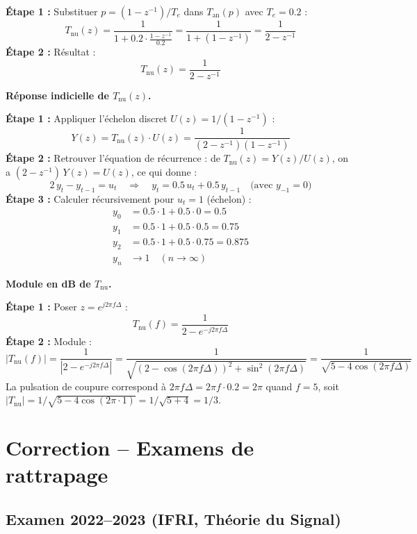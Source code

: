 \documentclass[12pt,a4paper]{article}
\newcommand{\step}[1]{\textcolor{coursbleu}{\textbf{Étape #1 :}}}
\newcommand{\encadre}[1]{\boxed{#1}}
\begin{document}
\begin{tcolorbox}[corrbox, title=Correction Q2]
\step{1} Substituer $p = (1-z^{-1})/T_e$ dans $T_{\text{an}}(p)$ avec $T_e = 0.2$ :
\[
  T_{\text{nu}}(z) = \frac{1}{1 + 0.2 \cdot \frac{1-z^{-1}}{0.2}}
                   = \frac{1}{1 + (1 - z^{-1})}
                   = \frac{1}{2 - z^{-1}}
\]
\step{2} Résultat :
\[
  \encadre{T_{\text{nu}}(z) = \frac{1}{2 - z^{-1}}}
\]

\textbf{Réponse indicielle de $T_{\text{nu}}(z)$.}

\step{1} Appliquer l'échelon discret $U(z) = 1/(1-z^{-1})$ :
\[
  Y(z) = T_{\text{nu}}(z)\cdot U(z) = \frac{1}{(2-z^{-1})(1-z^{-1})}
\]
\step{2} Retrouver l'équation de récurrence : de $T_{\text{nu}}(z) = Y(z)/U(z)$,
on a $(2-z^{-1})\,Y(z) = U(z)$, ce qui donne :
\[
  2\,y_t - y_{t-1} = u_t
  \quad\Longrightarrow\quad
  y_t = 0.5\,u_t + 0.5\,y_{t-1} \quad \text{(avec } y_{-1} = 0\text{)}
\]
\step{3} Calculer récursivement pour $u_t = 1$ (échelon) :
\begin{align*}
  y_0 &= 0.5\cdot 1 + 0.5\cdot 0 = 0.5 \\
  y_1 &= 0.5\cdot 1 + 0.5\cdot 0.5 = 0.75 \\
  y_2 &= 0.5\cdot 1 + 0.5\cdot 0.75 = 0.875 \\
  y_n &\to 1 \quad (n \to \infty)
\end{align*}

\textbf{Module en dB de $T_{\text{nu}}$.}

\step{1} Poser $z = e^{j2\pi f\Delta}$ :
\[
  T_{\text{nu}}(f) = \frac{1}{2 - e^{-j2\pi f\Delta}}
\]
\step{2} Module :
\[
  |T_{\text{nu}}(f)| = \frac{1}{|2 - e^{-j2\pi f\Delta}|}
  = \frac{1}{\sqrt{(2-\cos(2\pi f\Delta))^2 + \sin^2(2\pi f\Delta)}}
  = \frac{1}{\sqrt{5 - 4\cos(2\pi f\Delta)}}
\]
La pulsation de coupure correspond à $2\pi f\Delta = 2\pi f \cdot 0.2 = 2\pi$ quand $f=5$,
soit $|T_{\text{nu}}| = 1/\sqrt{5-4\cos(2\pi \cdot 1)} = 1/\sqrt{5+4} = 1/3$.
\end{tcolorbox}

\newpage
\section{Correction -- Examens de rattrapage}

\subsection{Examen 2022--2023 (IFRI, Théorie du Signal)}
\end{document}
